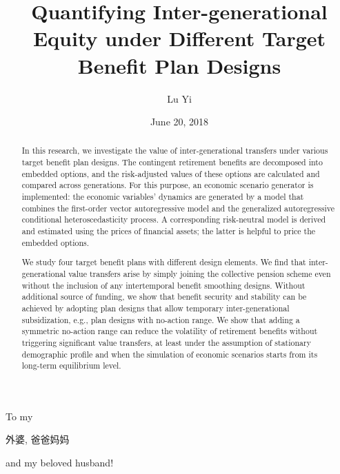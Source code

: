 \documentclass{sfuthesis}
\title{Quantifying Inter-generational Equity under Different Target Benefit Plan Designs}
\author{Lu Yi}
\date{June 20, 2018}
\numberwithin{equation}{chapter}
\begin{document}
	
	\frontmatter
	\maketitle{}
	\makecommittee{}
	
	
	\begin{abstract}
		\justify
		In this research, we investigate the value of inter-generational transfers under various target benefit plan designs. The contingent retirement benefits are decomposed into embedded options, and the risk-adjusted values of these options are calculated and compared across generations. For this purpose, an economic scenario generator is implemented: the economic variables’ dynamics are generated by a model that combines the first-order vector autoregressive model and the generalized autoregressive conditional heteroscedasticity process. A corresponding risk-neutral model is derived and estimated using the prices of financial assets; the latter is helpful to price the embedded options. 
		
		\justify
		We study four target benefit plans with different design elements. We find that inter-generational value transfers arise by simply joining the collective pension scheme even without the inclusion of any intertemporal benefit smoothing designs. Without additional source of funding, we show that benefit security and stability can be achieved by adopting plan designs that allow temporary inter-generational subsidization, e.g., plan designs with no-action range. We show that adding a symmetric no-action range can reduce the volatility of retirement benefits without triggering significant value transfers, at least under the assumption of stationary demographic profile and when the simulation of economic scenarios starts from its long-term equilibrium level.
	\end{abstract}
	
	
	\begin{dedication}
		To my \begin{CJK*}{UTF8}{gbsn}外婆, 爸爸妈妈\end{CJK*} and my beloved husband! 
	\end{dedication}
	
\end{document}
